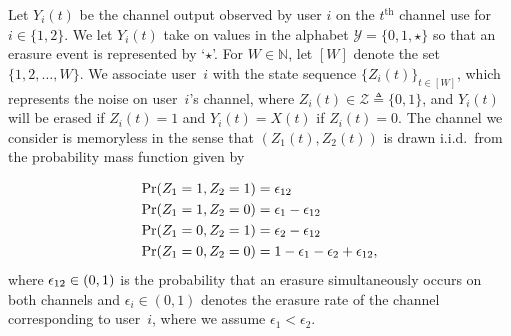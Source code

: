 Let $Y_{i}(t)$ be the channel output observed by user $i$ on the $t^{\mathrm{th}}$ channel use for $i \in \{1, 2\}$. %
We let $Y_{i}(t)$ take on values in the alphabet $\mathcal{Y} = \{0, 1, \star\}$ so that an erasure event is represented by `$\star$'.   
%
For $W \in \mathbb{N}$,  let $[W]$ denote the set $\{1, 2, \ldots, W\}$. We associate user~$i$ with the state sequence $\{Z_i(t)\}_{t \in [W]}$, which represents the noise on user~$i$'s channel, where $Z_i(t) \in \mathcal{Z} \triangleq \{0,1\}$,  and  $Y_i(t)$ will be erased if $Z_{i}(t) = 1$ and $Y_{i}(t) = X(t)$ if $Z_i(t) = 0$.  The channel we consider is memoryless in the sense that $(Z_{1}(t), Z_2(t))$ is drawn i.i.d.\ from the probability mass function given by   

\begin{subequations}
\label{eq:pmf_z1z2}
\begin{align}
	\textrm{Pr}(Z_1 = 1, Z_2 = 1) &= \epsilon_{12} \\
	\textrm{Pr}(Z_1 = 1, Z_2 = 0) &= \epsilon_1 - \epsilon_{12} \\
	\textrm{Pr}(Z_1 = 0, Z_2 = 1) &= \epsilon_2 - \epsilon_{12} \\
	\textrm{Pr}(Z_1 = 0, Z_2 = 0) &= 1 - \epsilon_1 - \epsilon_2 + \epsilon_{12},			
\end{align}
\end{subequations}
where $\epsilon_{12}\in (0, 1)$ is the probability that an erasure simultaneously occurs on both channels and $\epsilon_i \in (0, 1)$ denotes the erasure rate of the channel corresponding to user~$i$, where we assume $\epsilon_1 < \epsilon_2$.


